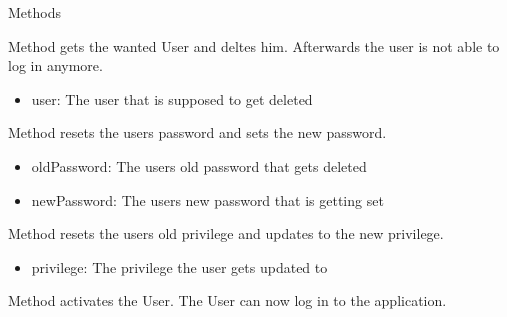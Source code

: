 \begin{methodenv}{Methods}


Method gets the wanted User and deltes him. Afterwards the user is not able to log in anymore.

\begin{itemize}
	\item{user:}
	The user that is supposed to get deleted
\end{itemize}



Method resets the users password and sets the new password.

\begin{itemize}
	\item{oldPassword:}
	The users old password that gets deleted
	\item{newPassword:}
	The users new password that is getting set
\end{itemize}


Method resets the users old privilege and updates to the new privilege.

\begin{itemize}
	\item{privilege:}
	The privilege the user gets updated to
\end{itemize}


Method activates the User. The User can now log in to the application.

\end{methodenv}

\newpage








